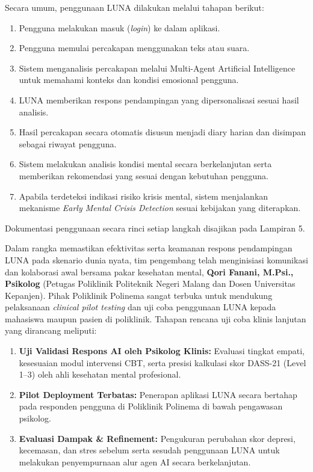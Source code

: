 
Secara umum, penggunaan LUNA dilakukan melalui tahapan berikut:
\begin{enumerate}[leftmargin=*,label=\arabic*.,itemsep=0.15em,parsep=0pt]
    \item Pengguna melakukan masuk (\textit{login}) ke dalam aplikasi.
    \item Pengguna memulai percakapan menggunakan teks atau suara.
    \item Sistem menganalisis percakapan melalui Multi-Agent Artificial Intelligence untuk memahami konteks dan kondisi emosional pengguna.
    \item LUNA memberikan respons pendampingan yang dipersonalisasi sesuai hasil analisis.
    \item Hasil percakapan secara otomatis disusun menjadi diary harian dan disimpan sebagai riwayat pengguna.
    \item Sistem melakukan analisis kondisi mental secara berkelanjutan serta memberikan rekomendasi yang sesuai dengan kebutuhan pengguna.
    \item Apabila terdeteksi indikasi risiko krisis mental, sistem menjalankan mekanisme \textit{Early Mental Crisis Detection} sesuai kebijakan yang diterapkan.
\end{enumerate}

Dokumentasi penggunaan secara rinci setiap langkah disajikan pada Lampiran 5.

\vspace{0.8em}

\indent Dalam rangka memastikan efektivitas serta keamanan respons pendampingan LUNA pada skenario dunia nyata, tim pengembang telah menginisiasi komunikasi dan kolaborasi awal bersama pakar kesehatan mental, \textbf{Qori Fanani, M.Psi., Psikolog} (Petugas Poliklinik Politeknik Negeri Malang dan Dosen Universitas Kepanjen). Pihak Poliklinik Polinema sangat terbuka untuk mendukung pelaksanaan \textit{clinical pilot testing} dan uji coba penggunaan LUNA kepada mahasiswa maupun pasien di poliklinik. Tahapan rencana uji coba klinis lanjutan yang dirancang meliputi:

\begin{enumerate}[leftmargin=*,label=\arabic*.,itemsep=0.15em,parsep=0pt]
    \item \textbf{Uji Validasi Respons AI oleh Psikolog Klinis:} Evaluasi tingkat empati, kesesuaian modul intervensi CBT, serta presisi kalkulasi skor DASS-21 (Level 1--3) oleh ahli kesehatan mental profesional.
    \item \textbf{Pilot Deployment Terbatas:} Penerapan aplikasi LUNA secara bertahap pada responden pengguna di Poliklinik Polinema di bawah pengawasan psikolog.
    \item \textbf{Evaluasi Dampak \& Refinement:} Pengukuran perubahan skor depresi, kecemasan, dan stres sebelum serta sesudah penggunaan LUNA untuk melakukan penyempurnaan alur agen AI secara berkelanjutan.
\end{enumerate}



